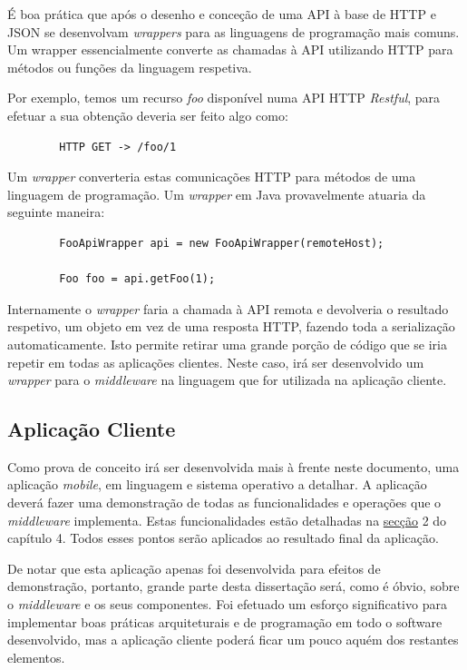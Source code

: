 É boa prática que após o desenho e conceção de uma API à base de HTTP e JSON se desenvolvam \textit{wrappers} para as linguagens de programação mais comuns. Um wrapper essencialmente converte as chamadas à API utilizando HTTP para métodos ou funções da linguagem respetiva.

Por exemplo, temos um recurso \textit{foo} disponível numa API HTTP \textit{Restful}, para efetuar a sua obtenção deveria ser feito algo como:

\begin{verbatim}
        HTTP GET -> /foo/1
\end{verbatim}

Um \textit{wrapper} converteria estas comunicações HTTP para métodos de uma linguagem de programação. Um \textit{wrapper} em Java provavelmente atuaria da seguinte maneira:

\begin{verbatim}
        FooApiWrapper api = new FooApiWrapper(remoteHost);

        Foo foo = api.getFoo(1);
\end{verbatim}


Internamente o \textit{wrapper} faria a chamada à API remota e devolveria o resultado respetivo, um objeto em vez de uma resposta HTTP, fazendo toda a serialização automaticamente. Isto permite retirar uma grande porção de código que se iria repetir em todas as aplicações clientes. Neste caso, irá ser desenvolvido um \textit{wrapper} para o \textit{middleware} na linguagem que for utilizada na aplicação cliente.

\subsection{Aplicação Cliente}

Como prova de conceito irá ser desenvolvida mais à frente neste documento, uma aplicação \textit{mobile}, em linguagem e sistema operativo a detalhar. A aplicação deverá fazer uma demonstração de todas as funcionalidades e operações que o \textit{middleware} implementa. Estas funcionalidades estão detalhadas na \hyperref[sec:funcionalidades]{secção} 2 do capítulo 4. Todos esses pontos serão aplicados ao resultado final da aplicação.

De notar que esta aplicação apenas foi desenvolvida para efeitos de demonstração, portanto, grande parte desta dissertação será, como é óbvio, sobre o \textit{middleware} e os seus componentes. Foi efetuado um esforço significativo para implementar boas práticas arquiteturais e de programação em todo o software desenvolvido, mas a aplicação cliente poderá ficar um pouco aquém dos restantes elementos.

